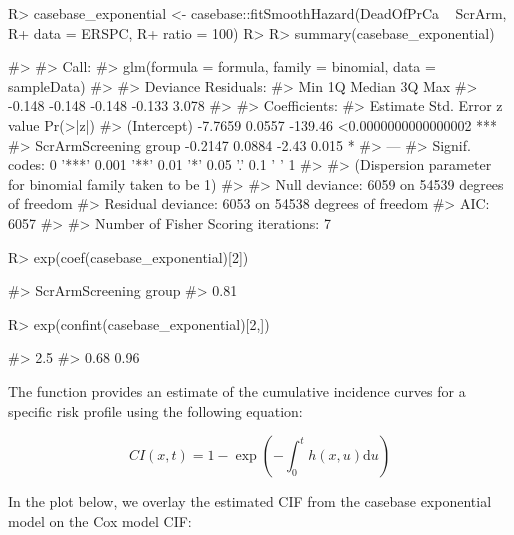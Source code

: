 \documentclass[
]{jss}
\begin{document}
\begin{CodeChunk}

\begin{CodeInput}
R> casebase_exponential <- casebase::fitSmoothHazard(DeadOfPrCa ~ ScrArm, 
R+                                                   data = ERSPC, 
R+                                                   ratio = 100)
R> 
R> summary(casebase_exponential)
\end{CodeInput}

\begin{CodeOutput}
#> 
#> Call:
#> glm(formula = formula, family = binomial, data = sampleData)
#> 
#> Deviance Residuals: 
#>    Min      1Q  Median      3Q     Max  
#> -0.148  -0.148  -0.148  -0.133   3.078  
#> 
#> Coefficients:
#>                       Estimate Std. Error z value            Pr(>|z|)    
#> (Intercept)            -7.7659     0.0557 -139.46 <0.0000000000000002 ***
#> ScrArmScreening group  -0.2147     0.0884   -2.43               0.015 *  
#> ---
#> Signif. codes:  0 '***' 0.001 '**' 0.01 '*' 0.05 '.' 0.1 ' ' 1
#> 
#> (Dispersion parameter for binomial family taken to be 1)
#> 
#>     Null deviance: 6059  on 54539  degrees of freedom
#> Residual deviance: 6053  on 54538  degrees of freedom
#> AIC: 6057
#> 
#> Number of Fisher Scoring iterations: 7
\end{CodeOutput}

\begin{CodeInput}
R> exp(coef(casebase_exponential)[2])
\end{CodeInput}

\begin{CodeOutput}
#> ScrArmScreening group 
#>                  0.81
\end{CodeOutput}

\begin{CodeInput}
R> exp(confint(casebase_exponential)[2,])
\end{CodeInput}

\begin{CodeOutput}
#>  2.5 %
#>   0.68   0.96
\end{CodeOutput}
\end{CodeChunk}

The  function provides an estimate of the cumulative
incidence curves for a specific risk profile using the following
equation:

\[ CI(x, t) = 1 - \exp\left( - \int_0^t h(x, u) \textrm{d}u \right) \]

In the plot below, we overlay the estimated CIF from the casebase
exponential model on the Cox model CIF:
\end{document}
